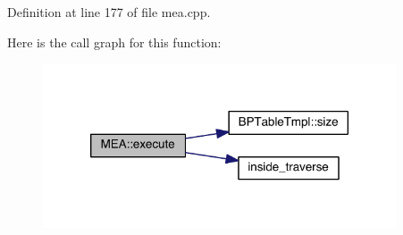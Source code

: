 Definition at line 177 of file mea.\+cpp.



Here is the call graph for this function\+:
\nopagebreak
\begin{figure}[H]
\begin{center}
\leavevmode
\includegraphics[width=296pt]{namespace_m_e_a_ae7da3a697d03f2697f3822dad28ae3d7_cgraph}
\end{center}
\end{figure}


